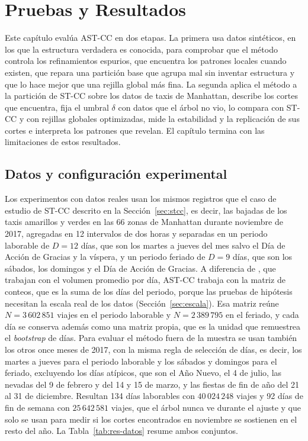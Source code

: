 
\chapter{Pruebas y Resultados}\label{chap:resultados}

Este capítulo evalúa AST-CC en dos etapas. La primera usa datos sintéticos, en los
que la estructura verdadera es conocida, para comprobar que el método controla los
refinamientos espurios, que encuentra los patrones locales cuando existen, que
repara una partición base que agrupa mal sin inventar estructura y que lo hace
mejor que una rejilla global más fina. La segunda aplica el método a la partición
de ST-CC sobre los datos de taxis de Manhattan, describe los cortes que encuentra,
fija el umbral $\delta$ con datos que el árbol no vio, lo compara con ST-CC y con
rejillas globales optimizadas, mide la estabilidad y la replicación de sus cortes e
interpreta los patrones que revelan. El capítulo termina con las limitaciones de
estos resultados.

\section{Datos y configuración experimental}\label{sec:res-datos}

Los experimentos con datos reales usan los mismos registros que el caso de estudio
de ST-CC descrito en la Sección~\ref{sec:stcc}, es decir, las bajadas de los taxis
amarillos y verdes en las 66 zonas de Manhattan durante noviembre de 2017,
agregadas en 12 intervalos de dos horas y separadas en un periodo laborable de
$D = 12$ días, que son los martes a jueves del mes salvo el Día de Acción de
Gracias y la víspera, y un periodo feriado de $D = 9$ días, que son los sábados,
los domingos y el Día de Acción de Gracias. A diferencia de
\citet{Liu2021}, que trabajan con el volumen promedio por día, AST-CC trabaja con la
matriz de conteos, que es la suma de los días del periodo, porque las pruebas de
hipótesis necesitan la escala real de los datos (Sección~\ref{sec:escala}). Esa
matriz reúne $N = 3\,602\,851$ viajes en el periodo laborable y $N = 2\,389\,795$
en el feriado, y cada día se conserva además como una matriz propia, que es la
unidad que remuestrea el \emph{bootstrap} de días. Para evaluar el método fuera de
la muestra se usan también los otros once meses de 2017, con la misma regla de
selección de días, es decir, los martes a jueves para el periodo laborable y los
sábados y domingos para el feriado, excluyendo los días atípicos, que son el Año
Nuevo, el 4 de julio, las nevadas del 9 de febrero y del 14 y 15 de marzo, y las
fiestas de fin de año del 21 al 31 de diciembre. Resultan 134 días laborables con
$40\,024\,248$ viajes y 92 días de fin de semana con $25\,642\,581$ viajes, que el
árbol nunca ve durante el ajuste y que solo se usan para medir si los cortes
encontrados en noviembre se sostienen en el resto del año. La
Tabla~\ref{tab:res-datos} resume ambos conjuntos.

